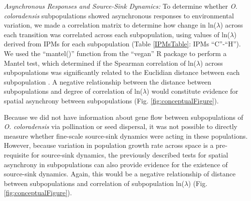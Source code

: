 \documentclass[12pt, letterpaper]{article}
\begin{document}
\textit{Asynchronous Responses and Source-Sink Dynamics:} To determine whether \textit{O. coloradensis} subpopulations showed asynchronous responses to environmental variation, we made a correlation matrix to determine how change in ln($\lambda$) across each transition was correlated across each subpopulation, using values of ln($\lambda$) derived from IPMs for each subpopulation (Table \ref{IPMsTable}: IPMs “C”-“H”). We used the “mantel()” function from the “vegan” R package to perform a Mantel test, which determined if the Spearman correlation of ln($\lambda$) across subpopulations was significantly related to the Euclidian distance between each subpopulation \cite{Oksanen2020Vegan:Package}. A negative relationship between the distance between subpopulations and degree of correlation of ln($\lambda$) would constitute evidence for spatial asynchrony between subpopulations (Fig. \ref{fig:conceptualFigure}).   

Because we did not have information about gene flow between subpopulations of \textit{O. coloradensis} via pollination or seed dispersal, it was not possible to directly measure whether fine-scale source-sink dynamics were acting in these populations. However, because variation in population growth rate across space is a pre-requisite for source-sink dynamics, the previously described tests for spatial asynchrony in subpopulations can also provide evidence for the existence of source-sink dynamics. Again, this would be a negative relationship of distance between subpopulations and correlation of subpopulation ln($\lambda$) (Fig. \ref{fig:conceptualFigure}).  


 
\end{document}
